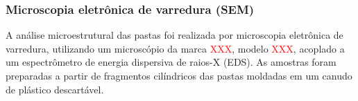 \subsubsection{Microscopia eletrônica de varredura (SEM)}
\label{subsubsec:microscopia_eletronica_de_varredura}

A análise microestrutural das pastas foi realizada por microscopia eletrônica de varredura, utilizando um microscópio da marca \textcolor{red}{XXX}, modelo \textcolor{red}{XXX}, acoplado a um espectrômetro de energia dispersiva de raios-X (EDS). As amostras foram preparadas a partir de fragmentos cilíndricos das pastas moldadas em um canudo de plástico descartável. 

